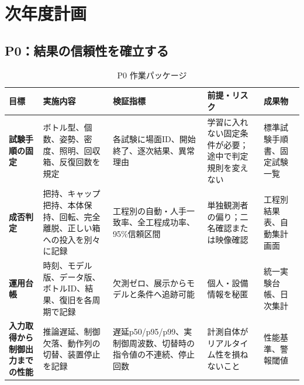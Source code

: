 \chapter{次年度計画}


\begin{landscape}
\section{P0：結果の信頼性を確立する}
\begin{table}[H]
\centering\footnotesize
\renewcommand{\arraystretch}{1.35}
\caption{P0 作業パッケージ}
\begin{tabularx}{\linewidth}{>{\bfseries}p{24mm}p{48mm}p{65mm}p{55mm}X}
\toprule
目標 & 実施内容 & 検証指標 & 前提・リスク & 成果物\\
\midrule
試験手順の固定 & ボトル型、個数、姿勢、密度、照明、回収箱、反復回数を規定 & 各試験に場面ID、開始終了、逐次結果、異常理由 & 学習に入れない固定条件が必要；途中で判定規則を変えない & 標準試験手順書、固定試験一覧\\
成否判定 & 把持、キャップ把持、本体保持、回転、完全離脱、正しい箱への投入を別々に記録 & 工程別の自動・人手一致率、全工程成功率、95\%信頼区間 & 単独観測者の偏り；二名確認または映像確認 & 工程別結果表、自動集計画面\\
運用台帳 & 時刻、モデル版、データ版、ボトルID、結果、復旧を各周期で記録 & 欠測ゼロ、展示からモデルと条件へ追跡可能 & 個人・設備情報を秘匿 & 統一実験台帳、日次集計\\
入力取得から制御出力までの性能 & 推論遅延、制御欠落、動作列の切替、装置停止を記録 & 遅延p50/p95/p99、実制御周波数、切替時の指令値の不連続、停止回数 & 計測自体がリアルタイム性を損ねないこと & 性能基準、警報閾値\\
\bottomrule
\end{tabularx}
\end{table}

\vspace{3mm}

\end{landscape}
